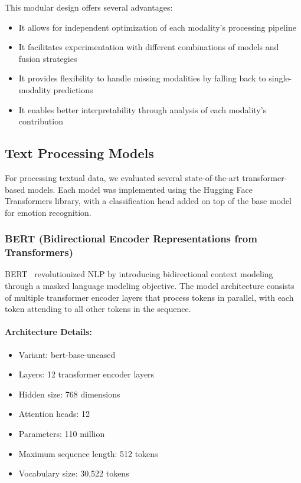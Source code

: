 \documentclass[12pt]{article}
\begin{document}
This modular design offers several advantages:
\begin{itemize}
    \item It allows for independent optimization of each modality's processing pipeline
    \item It facilitates experimentation with different combinations of models and fusion strategies
    \item It provides flexibility to handle missing modalities by falling back to single-modality predictions
    \item It enables better interpretability through analysis of each modality's contribution
\end{itemize}

\subsection{Text Processing Models}
For processing textual data, we evaluated several state-of-the-art transformer-based models. Each model was implemented using the Hugging Face Transformers library, with a classification head added on top of the base model for emotion recognition.

\subsubsection{BERT (Bidirectional Encoder Representations from Transformers)}
BERT~\cite{devlin2018bert} revolutionized NLP by introducing bidirectional context modeling through a masked language modeling objective. The model architecture consists of multiple transformer encoder layers that process tokens in parallel, with each token attending to all other tokens in the sequence.

\paragraph{Architecture Details:}
\begin{itemize}
    \item Variant: bert-base-uncased
    \item Layers: 12 transformer encoder layers
    \item Hidden size: 768 dimensions
    \item Attention heads: 12
    \item Parameters: 110 million
    \item Maximum sequence length: 512 tokens
    \item Vocabulary size: 30,522 tokens
\end{itemize}
\end{document}
